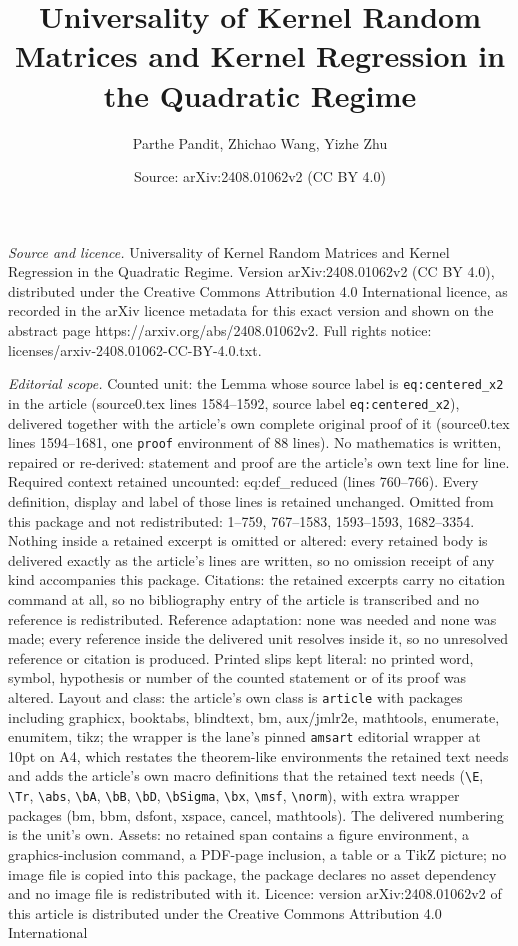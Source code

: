 \documentclass[10pt,a4paper]{amsart}
\title[Universality of Kernel Random Matrices and Kernel Regression]{Universality of Kernel Random Matrices and Kernel Regression in the Quadratic Regime}
\author{Parthe Pandit, Zhichao Wang, Yizhe Zhu}
\date{Source: arXiv:2408.01062v2 (CC BY 4.0)}
\begin{document}
\maketitle

\noindent\emph{Source and licence.} Universality of Kernel Random Matrices and Kernel Regression in the Quadratic Regime. Version arXiv:2408.01062v2 (CC BY 4.0), distributed under the Creative Commons Attribution 4.0 International licence, as recorded in the arXiv licence metadata for this exact version and shown on the abstract page https://arxiv.org/abs/2408.01062v2. Full rights notice: licenses/arxiv-2408.01062-CC-BY-4.0.txt.\par\smallskip

\noindent\textit{Editorial scope.} Counted unit: the Lemma whose source label is \texttt{eq:centered\_x2} in the article (source0.tex lines 1584--1592, source label \texttt{eq:centered\_x2}), delivered together with the article's own complete original proof of it (source0.tex lines 1594--1681, one \texttt{proof} environment of 88 lines). No mathematics is written, repaired or re-derived: statement and proof are the article's own text line for line. Required context retained uncounted: eq:def\_reduced (lines 760--766). Every definition, display and label of those lines is retained unchanged. Omitted from this package and not redistributed: 1--759, 767--1583, 1593--1593, 1682--3354. Nothing inside a retained excerpt is omitted or altered: every retained body is delivered exactly as the article's lines are written, so no omission receipt of any kind accompanies this package. Citations: the retained excerpts carry no citation command at all, so no bibliography entry of the article is transcribed and no reference is redistributed. Reference adaptation: none was needed and none was made; every reference inside the delivered unit resolves inside it, so no unresolved reference or citation is produced. Printed slips kept literal: no printed word, symbol, hypothesis or number of the counted statement or of its proof was altered. Layout and class: the article's own class is \texttt{article} with packages including graphicx, booktabs, blindtext, bm, aux/jmlr2e, mathtools, enumerate, enumitem, tikz; the wrapper is the lane's pinned \texttt{amsart} editorial wrapper at 10pt on A4, which restates the theorem-like environments the retained text needs and adds the article's own macro definitions that the retained text needs (\texttt{\textbackslash E}, \texttt{\textbackslash Tr}, \texttt{\textbackslash abs}, \texttt{\textbackslash bA}, \texttt{\textbackslash bB}, \texttt{\textbackslash bD}, \texttt{\textbackslash bSigma}, \texttt{\textbackslash bx}, \texttt{\textbackslash msf}, \texttt{\textbackslash norm}), with extra wrapper packages (bm, bbm, dsfont, xspace, cancel, mathtools). The delivered numbering is the unit's own. Assets: no retained span contains a figure environment, a graphics-inclusion command, a PDF-page inclusion, a table or a TikZ picture; no image file is copied into this package, the package declares no asset dependency and no image file is redistributed with it. Licence: version arXiv:2408.01062v2 of this article is distributed under the Creative Commons Attribution 4.0 International 
\end{document}
